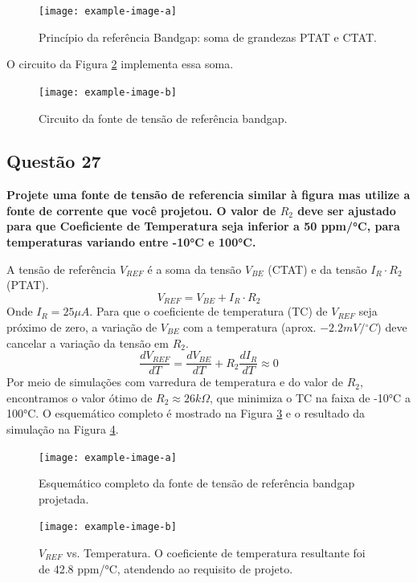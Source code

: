 ﻿\documentclass[12pt,a4paper]{article}
\newcommand{\degree}{\ensuremath{{}^\circ}}
\begin{document}
\begin{figure}[H]
\centering
\texttt{[image: example-image-a]}
\caption{Princípio da referência Bandgap: soma de grandezas PTAT e CTAT.}
\label{fig:bandgap_principle}
\end{figure}

O circuito da Figura \ref{fig:bandgap_circuit} implementa essa soma.

\begin{figure}[H]
\centering
\texttt{[image: example-image-b]}
\caption{Circuito da fonte de tensão de referência bandgap.}
\label{fig:bandgap_circuit}
\end{figure}

\subsection*{Questão 27}
\textbf{Projete uma fonte de tensão de referencia similar à figura mas utilize a fonte de corrente que você projetou. O valor de $R_2$ deve ser ajustado para que Coeficiente de Temperatura seja inferior a 50 ppm/°C, para temperaturas variando entre -10°C e 100°C.}

A tensão de referência $V_{REF}$ é a soma da tensão $V_{BE}$ (CTAT) e da tensão $I_R \cdot R_2$ (PTAT).
\begin{equation}
V_{REF} = V_{BE} + I_R \cdot R_2
\end{equation}
Onde $I_R = 25\mu A$. Para que o coeficiente de temperatura (TC) de $V_{REF}$ seja próximo de zero, a variação de $V_{BE}$ com a temperatura (aprox. $-2.2mV/\degree C$) deve cancelar a variação da tensão em $R_2$.
\begin{equation}
\frac{dV_{REF}}{dT} = \frac{dV_{BE}}{dT} + R_2 \frac{dI_R}{dT} \approx 0
\end{equation}
Por meio de simulações com varredura de temperatura e do valor de $R_2$, encontramos o valor ótimo de $R_2 \approx 26k\Omega$, que minimiza o TC na faixa de -10°C a 100°C. O esquemático completo é mostrado na Figura \ref{fig:bandgap_complete_schematic} e o resultado da simulação na Figura \ref{fig:vref_vs_temp}.

\begin{figure}[H]
\centering
\texttt{[image: example-image-a]}
\caption{Esquemático completo da fonte de tensão de referência bandgap projetada.}
\label{fig:bandgap_complete_schematic}
\end{figure}

\begin{figure}[H]
\centering
\texttt{[image: example-image-b]}
\caption{$V_{REF}$ vs. Temperatura. O coeficiente de temperatura resultante foi de 42.8 ppm/°C, atendendo ao requisito de projeto.}
\label{fig:vref_vs_temp}
\end{figure}
\end{document}
